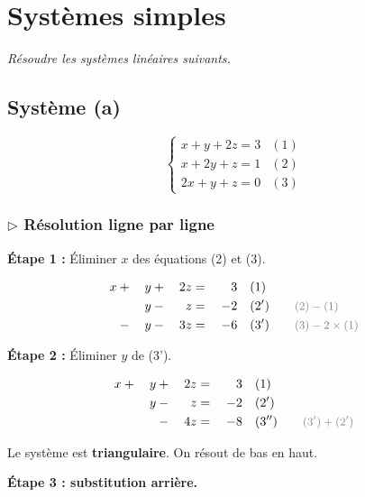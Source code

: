 \documentclass[12pt,a4paper]{article}
\newcommand{\ann}[1]{\qquad\textcolor{opcolor}{\text{\small #1}}}
\begin{document}
\section{Systèmes simples}

\textit{Résoudre les systèmes linéaires suivants.}

\subsection{Système (a)}

\[
\begin{cases}
  x + y + 2z = 3 & (1)\\
  x + 2y + z = 1 & (2)\\
  2x + y + z = 0 & (3)
\end{cases}
\]

\subsubsection*{$\triangleright$ Résolution ligne par ligne}

\textbf{Étape 1 :} Éliminer $x$ des équations (2) et (3).

\begin{alignat*}{4}
  x &{}+{}& y  &{}+{}& 2z &{}={}& 3   &\quad (1)\\
    &     & y  &{}-{}& z  &{}={}& -2  &\quad (2') \ann{$(2)-(1)$}\\
    &{}-{}& y  &{}-{}& 3z &{}={}& -6  &\quad (3') \ann{$(3) - 2\times(1)$}
\end{alignat*}

\textbf{Étape 2 :} Éliminer $y$ de (3').

\begin{alignat*}{4}
  x &{}+{}& y  &{}+{}& 2z &{}={}& 3   &\quad (1)\\
    &     & y  &{}-{}& z  &{}={}& -2  &\quad (2')\\
    &     &    &{}-{}& 4z &{}={}& -8  &\quad (3'') \ann{$(3') + (2')$}
\end{alignat*}

Le système est \textbf{triangulaire}. On résout de bas en haut.

\textbf{Étape 3 : substitution arrière.}
\end{document}
